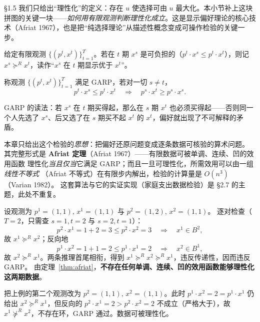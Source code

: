 §1.5 我们只给出“理性化”的定义：存在 $u$ 使选择可由 $u$ 最大化。本小节补上这块拼图的关键一块——\emph{如何用有限观测判断理性化成立}。这是显示偏好理论的核心技术（Afriat 1967），也是把“纯选择理论”从描述性概念变成可操作检验的关键一步。

\begin{definition}[直接显示偏好]
给定有限观测 $\{(p^{t},x^{t})\}_{t=1}^{T}$。若在 $t$ 期 $x^{s}$ 是可负担的（$p^{t}\cdot x^{s}\le p^{t}\cdot x^{t}$），则记 $x^{s}\succeq^{R}x^{t}$，读作“$x^{s}$ 在 $t$ 期显示优于 $x^{t}$”。
\end{definition}

\begin{definition}
称观测 $\{(p^{t},x^{t})\}_{t=1}^{T}$ 满足 GARP，若对一切 $s\ne t$，
\[
p^{t}\cdot x^{s}\le p^{t}\cdot x^{t}\quad\Longrightarrow\quad
p^{s}\cdot x^{t}\ge p^{s}\cdot x^{s}.
\]
\end{definition}

GARP 的读法：若 $x^{s}$ 在 $t$ 期买得起，那么在 $s$ 期 $x^{t}$ 也必须买得起——否则同一个人先选了 $x^{s}$、后又选了在 $s$ 期买不起 $x^{t}$ 的 $x^{t}$，偏好就出现了不可解释的矛盾。

\begin{remark}[预告：完整结论见 \S2.7.5]
本章只给出这个检验的\emph{思想}：把偏好还原问题变成逐条数据可核验的算术问题。
其完整形式是 \textbf{Afriat 定理}（Afriat 1967）——有限数据可被单调、连续、凹的效用函数
理性化\emph{当且仅当}它满足 GARP；而且一旦可理性化，所需效用可以由一组\emph{线性不等式}
（Afriat 不等式）在有限步内解出，检验的计算量是 $O(n^{3})$（Varian 1982）。
这套算法与它的实证实现（家庭支出数据检验）是 \S2.7 的主题，此处不重复。
\end{remark}

\begin{example}\label{ex:garp}
设观测为 $p^{1}=(1,1),\,x^{1}=(1,1)$ 与 $p^{2}=(1,2),\,x^{2}=(1,1)$。
逐对检查（$T=2$，只需查 $s=1,t=2$ 与 $s=2,t=1$）：
\[
p^{2}\cdot x^{1}=1+2=3\le p^{2}\cdot x^{2}=3
\quad\Longrightarrow\quad x^{1}\in B^{2},
\]
故 $x^{1}\succeq^{R}x^{2}$；反向地
\[
p^{1}\cdot x^{2}=1+1=2\le p^{1}\cdot x^{1}=2
\quad\Longrightarrow\quad x^{2}\in B^{1},
\]
故 $x^{2}\succeq^{R}x^{1}$。两条推理首尾相衔，得到 $x^{1}\succeq^{R}x^{2}\succeq^{R}x^{1}$，违反传递性，因而违反 GARP。
由定理~\ref{thm:afriat}，\textbf{不存在任何单调、连续、凹的效用函数能够理性化这两期数据}。
\end{example}

\begin{example}[同一检验通过的情形]\label{ex:garp-ok}
把上例的第二个观测改为 $p^{2}=(1,1),\,x^{2}=(1,1)$。此时 $p^{1}\cdot x^{2}=2=p^{1}\cdot x^{1}$ 仍给出 $x^{2}\succeq^{R}x^{1}$，但反向的 $p^{2}\cdot x^{1}=2>p^{2}\cdot x^{2}=2$ 不成立（严格大于），故 $x^{1}\not\succeq^{R}x^{2}$，不存在环，GARP 通过。数据可被理性化。
\end{example}

